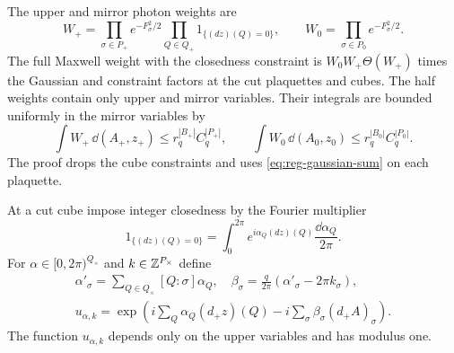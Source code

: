 The upper and mirror photon weights are
\begin{equation}\label{eq:reg-half-photon-weights}
 W_+=\prod_{\sigma\in P_+}e^{-F_\sigma^2/2}
               \prod_{Q\in Q_+}1_{\{(dz)(Q)=0\}},
 \qquad W_0=\prod_{\sigma\in P_0}e^{-F_\sigma^2/2}.
\end{equation}
The full Maxwell weight with the closedness constraint is
$W_0W_+\Theta(W_+)$ times the Gaussian and constraint factors at
the cut plaquettes and cubes. The half weights contain only upper
and mirror variables. Their integrals are bounded uniformly in the
mirror variables by
\[
 \int W_+\,\dd(A_+,z_+)
       \le r_q^{|B_+|}C_q^{|P_+|},\qquad
 \int W_0\,\dd(A_0,z_0)
       \le r_q^{|B_0|}C_q^{|P_0|}.
\]
The proof drops the cube constraints and uses
\eqref{eq:reg-gaussian-sum} on each plaquette.

At a cut cube impose integer closedness by the Fourier multiplier
\[
 1_{\{(dz)(Q)=0\}}
   =\int_0^{2\pi}e^{i\alpha_Q(dz)(Q)}\frac{\dd\alpha_Q}{2\pi}.
\]
For $\alpha\in[0,2\pi)^{Q_\times}$ and
$k\in\mathbb Z^{P_\times}$ define
\begin{equation}\label{eq:reg-dual-crossing-variables}
 \begin{aligned}
 \alpha'_\sigma=\sum_{Q\in Q_\times}[Q:\sigma]\alpha_Q,
 \quad \beta_\sigma=\frac{q}{2\pi}(\alpha'_\sigma-2\pi k_\sigma),
 \\
 u_{\alpha,k}
 =\exp\left(i\sum_Q\alpha_Q(d_+z)(Q)
                  -i\sum_\sigma\beta_\sigma(d_+A)_\sigma\right).
 \end{aligned}
\end{equation}
The function $u_{\alpha,k}$ depends only on the upper variables and
has modulus one.

